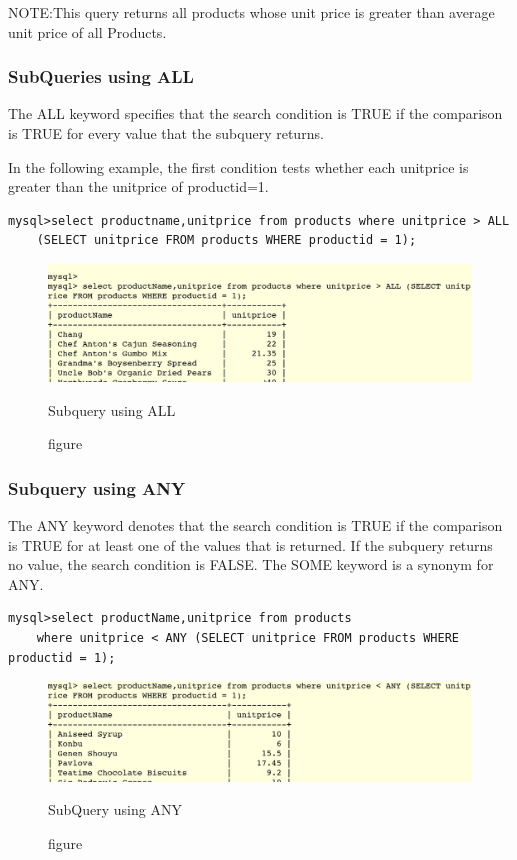 \documentclass[11pt,a4paper]{article}
\begin{document}
NOTE:This query returns all products whose unit price is greater than average unit price of all Products.

\subsubsection*{SubQueries using ALL}
The ALL keyword specifies that the search condition is TRUE if the comparison is TRUE for every value that the subquery returns.

In the following example, the first condition tests whether each unitprice is greater than the unitprice of productid=1.
\begin{verbatim}
mysql>select productname,unitprice from products where unitprice > ALL 
    (SELECT unitprice FROM products WHERE productid = 1);\end{verbatim}

\begin{figure}[ht]
\begin{center}
\includegraphics[scale=0.3]{all.png}
\caption{figure}{Subquery using ALL}
\end{center}
\end{figure}

\subsubsection*{Subquery using ANY}
The ANY keyword denotes that the search condition is TRUE if the comparison is TRUE for at least one of the values that is returned. If the subquery returns no value, the search condition is FALSE. The SOME keyword is a synonym for ANY.
\begin{verbatim}
mysql>select productName,unitprice from products 
    where unitprice < ANY (SELECT unitprice FROM products WHERE productid = 1);\end{verbatim}
\begin{figure}[ht]
\begin{center}
\includegraphics[scale=0.3]{any.png}
\caption{figure}{SubQuery using ANY}
\end{center}
\end{figure}  
\end{document}
